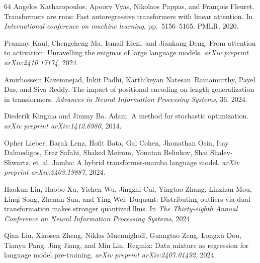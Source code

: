 \documentclass{article} \usepackage{iclr2025_conference,times}
\begin{document}
\begin{thebibliography}{64}
Angelos Katharopoulos, Apoorv Vyas, Nikolaos Pappas, and Fran{\c{c}}ois Fleuret.
\newblock Transformers are rnns: Fast autoregressive transformers with linear attention.
\newblock In \emph{International conference on machine learning}, pp.\  5156--5165. PMLR, 2020.

Prannay Kaul, Chengcheng Ma, Ismail Elezi, and Jiankang Deng.
\newblock From attention to activation: Unravelling the enigmas of large language models.
\newblock \emph{arXiv preprint arXiv:2410.17174}, 2024.

Amirhossein Kazemnejad, Inkit Padhi, Karthikeyan Natesan~Ramamurthy, Payel Das, and Siva Reddy.
\newblock The impact of positional encoding on length generalization in transformers.
\newblock \emph{Advances in Neural Information Processing Systems}, 36, 2024.

Diederik Kingma and Jimmy Ba.
\newblock Adam: A method for stochastic optimization.
\newblock \emph{arXiv preprint arXiv:1412.6980}, 2014.

Opher Lieber, Barak Lenz, Hofit Bata, Gal Cohen, Jhonathan Osin, Itay Dalmedigos, Erez Safahi, Shaked Meirom, Yonatan Belinkov, Shai Shalev-Shwartz, et~al.
\newblock Jamba: A hybrid transformer-mamba language model.
\newblock \emph{arXiv preprint arXiv:2403.19887}, 2024.

Haokun Lin, Haobo Xu, Yichen Wu, Jingzhi Cui, Yingtao Zhang, Linzhan Mou, Linqi Song, Zhenan Sun, and Ying Wei.
\newblock Duquant: Distributing outliers via dual transformation makes stronger quantized llms.
\newblock In \emph{The Thirty-eighth Annual Conference on Neural Information Processing Systems}, 2024.

Qian Liu, Xiaosen Zheng, Niklas Muennighoff, Guangtao Zeng, Longxu Dou, Tianyu Pang, Jing Jiang, and Min Lin.
\newblock Regmix: Data mixture as regression for language model pre-training.
\newblock \emph{arXiv preprint arXiv:2407.01492}, 2024{}.


\end{thebibliography}
\end{document}
